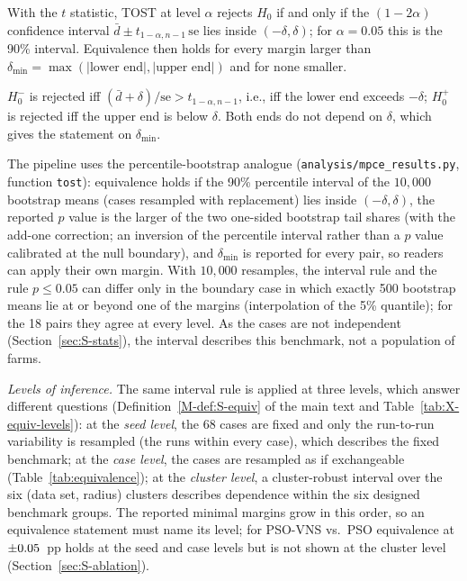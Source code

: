 \begin{lemS}
\label{lem:S-tost-ci}
With the $t$ statistic, TOST at level $\alpha$ rejects $H_0$ if and only if the $(1-2\alpha)$ confidence interval $\bar d\pm t_{1-\alpha,n-1}\,\mathrm{se}$ lies inside $(-\delta,\delta)$; for $\alpha=0.05$ this is the 90\% interval. Equivalence then holds for every margin larger than $\delta_{\min}=\max(\lvert\text{lower end}\rvert,\lvert\text{upper end}\rvert)$ and for none smaller.
\end{lemS}
\begin{thSproof}
$H_0^-$ is rejected iff $(\bar d+\delta)/\mathrm{se}>t_{1-\alpha,n-1}$, i.e., iff the lower end exceeds $-\delta$; $H_0^+$ is rejected iff the upper end is below $\delta$. Both ends do not depend on $\delta$, which gives the statement on $\delta_{\min}$.
\end{thSproof}
The pipeline uses the percentile-bootstrap analogue (\texttt{analysis/mpce\_results.py}, function \texttt{tost}): equivalence holds if the 90\% percentile interval of the $10{,}000$ bootstrap means (cases resampled with replacement) lies inside $(-\delta,\delta)$, the reported $p$ value is the larger of the two one-sided bootstrap tail shares (with the add-one correction; an inversion of the percentile interval rather than a $p$ value calibrated at the null boundary), and $\delta_{\min}$ is reported for every pair, so readers can apply their own margin. With $10{,}000$ resamples, the interval rule and the rule $p\le0.05$ can differ only in the boundary case in which exactly 500 bootstrap means lie at or beyond one of the margins (interpolation of the 5\% quantile); for the 18 pairs they agree at every level. As the cases are not independent (Section~\ref{sec:S-stats}), the interval describes this benchmark, not a population of farms.

\emph{Levels of inference.} The same interval rule is applied at three levels, which answer different questions (Definition~\ref{M-def:S-equiv} of the main text and Table~\ref{tab:X-equiv-levels}): at the \emph{seed level}, the 68 cases are fixed and only the run-to-run variability is resampled (the runs within every case), which describes the fixed benchmark; at the \emph{case level}, the cases are resampled as if exchangeable (Table~\ref{tab:equivalence}); at the \emph{cluster level}, a cluster-robust interval over the six (data set, radius) clusters describes dependence within the six designed benchmark groups. The reported minimal margins grow in this order, so an equivalence statement must name its level; for PSO-VNS vs.\ PSO equivalence at $\pm0.05$~pp holds at the seed and case levels but is not shown at the cluster level (Section~\ref{sec:S-ablation}).

